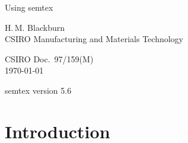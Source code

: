 \documentclass[11pt,a4paper]{report}
\begin{document}
\begin{titlepage}
\centering

\vspace*{\fill}

{\huge Using {\sffamily semtex}}

\vspace{\fill}

\begin{figure}[h]
\begin{center}
\end{center}
\end{figure}

\vspace{\fill}

{\large H.\,M. Blackburn}\\
CSIRO Manufacturing and Materials Technology\\

\vspace{\fill}

{\large CSIRO Doc.\ 97/159(M)}\\
\today

\textsf{semtex} version 5.6

\vspace*{\fill}

\end{titlepage}


\tableofcontents

\clearpage

\chapter{Introduction}
\end{document}
